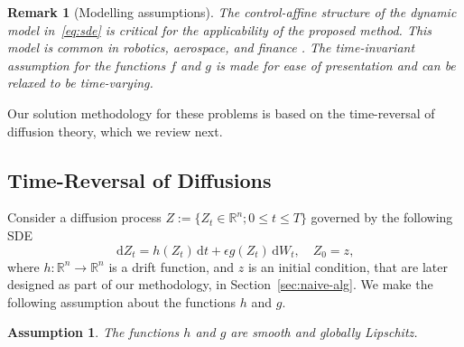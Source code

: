 \documentclass[letterpaper, 10 pt, conference]{ieeeconf}  %
\def\R{\mathbb{R}}
\def\R{\mathbb{R}}
\newtheorem{remark}{Remark}
\newtheorem{assumption}{Assumption}
\newcommand{\ud}{\,\mathrm{d}}
\begin{document}
\begin{remark}[Modelling assumptions]
   The control-affine structure of the dynamic model in~\eqref{eq:sde} is critical for the applicability of the proposed method. This model is common in robotics, aerospace, and finance \cite{zhou2023safe,liu2019fuel,calafiore2008multi}. The time-invariant assumption for the functions $f$ and $g$ is made for ease of presentation and can be relaxed to be time-varying. 
\end{remark}


Our solution methodology for these problems is based on the time-reversal of diffusion theory, which we review  next. 


\subsection{Time-Reversal of Diffusions}
\label{sec:tr}
Consider a diffusion process $Z \mathrel{:=} \{Z_t\in \R^n;0 \leq t \leq T\}$ governed by the following SDE 
\begin{equation}\label{eq:fsde}
    \ud Z_t \!=\! h(Z_t) \ud t + \epsilon g(Z_t) \ud W_t,\quad Z_0=z,
    \end{equation}
    where   $h:  \R^n \rightarrow \R^n$ is a drift function, and $z$ is an initial condition, that are later designed as part of our methodology, in Section~\ref{sec:naive-alg}.  We make the following assumption about the functions $h$ and $g$. 
    
\begin{assumption}\label{asum-fg}
    The functions $h$ and $g$ are smooth and globally Lipschitz. 
\end{assumption}
\end{document}
